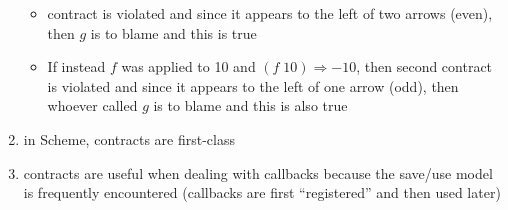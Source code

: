 \documentclass[12pt]{article}	%
\begin{document}
\begin{enumerate}
\begin{itemize}
\item \greaterthannine contract is violated and since it appears to the left of two arrows (even), then $g$ is to blame and this is true
\item If instead $f$ was applied to 10 and $(f \; 10) \Rightarrow -10$, then second \betweenzeroandninetynine contract is violated and since it appears to the left of one arrow (odd), then whoever called $g$ is to blame and this is also true
\end{itemize}

	\item in Scheme, contracts are first-class
	\item contracts are useful when dealing with callbacks because the save/use model is frequently encountered (callbacks are first ``registered'' and then used later)


\end{enumerate}
\end{document}
